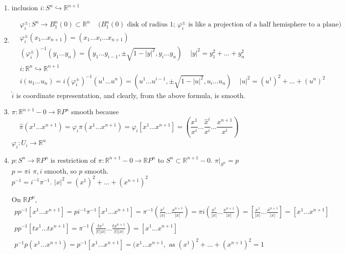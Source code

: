 \documentclass[11pt]{amsart}
\theoremstyle{definition}
\begin{document}
\begin{enumerate}
\item[(a)] inclusion $i: S^n \hookrightarrow \mathbb{R}^{n+1}$
\item[(b)]
\[
\begin{aligned}
  & \varphi_i^{\pm}:S^n \to B_1^n(0) \subset \mathbb{R}^n \quad \, \text{($B_1^n(0)$ disk of radius 1; $\varphi_i^{\pm} $ is like a projection of a half hemisphere to a plane)} \\
  & \varphi_i^{\pm}(x_1 \dots x_{n+1}) = (x_1 \dots \widehat{x}_i \dots x_{n+1} ) \\
  & (\varphi_i^{\pm})^{-1}(y_1 \dots y_n) = (y_1 \dots y_{i-1}, \pm \sqrt{ 1 - |y|^2 } , y_i \dots y_n ) \quad \, |y|^2 = y_1^2 + \dots + y_n^2
\end{aligned}
\]
\[
\begin{aligned}
  & \widehat{i} : \mathbb{R}^n \hookrightarrow \mathbb{R}^{n+1} \\
  & \widehat{i}(u_1 \dots u_n) = i (\varphi_i^{\pm})^{-1}(u^1 \dots u^n) = (u^1 \dots u^{i-1}, \pm \sqrt{ 1 - |u|^2 } , u_i \dots u_n )  \quad \, |u|^2 =  (u^1)^2  + \dots + (u^n)^2
\end{aligned}
\]
$\widehat{i}$ is coordinate representation, and clearly, from the above formula, is smooth.
\item[(c)] $\pi : \mathbb{R}^{n+1} - 0 \to \mathbb{R}P^n$ smooth because
\[
\widehat{\pi}(x^1 \dots x^{n+1})  = \varphi_i \pi(x^1 \dots x^{n+1}) = \varphi_i[x^1 \dots x^{n+1}] = \left( \frac{x^1 }{ x^i } \dots \frac{ \widehat{x}^i}{ x^i } \dots \frac{x^{n+1}}{ x^i } \right)
\]
$\varphi_i : U_i \to \mathbb{R}^n$
\item[(d)] $p : S^n \to \mathbb{R}P^n$ is restriction of $\pi: \mathbb{R}^{n+1} - 0 \to \mathbb{R}P^n$ to $S^n \subset \mathbb{R}^{n+1} -0$.  $\left. \pi \right|_{S^n} = p$ \\
$p = \pi i$ $\pi,i$ smooth, so $p$ smooth.  \\
$p^{-1} = i^{-1} \pi^{-1}$.  $|x|^2 = (x^1)^2 + \dots + (x^{n+1})^2$

On $\mathbb{R}P^n$,
\[
\begin{gathered}
  pp^{-1}[x^1 \dots x^{n+1} ] = p i^{-1} \pi^{-1}[x^1 \dots x^{n+1} ] = \pi^{-1}\left( \frac{x^1}{ |x| } \dots \frac{x^{n+1}}{ |x| } \right) = \pi i\left( \frac{x^1}{|x|} \dots \frac{x^{n+1}}{ |x|} \right) = \left[ \frac{x^1}{ |x|} \dots \frac{x^{n+1}}{ |x|} \right] = [x^1 \dots x^{n+1} ] \\
  pp^{-1}[tx^1 \dots tx^{n+1} ] = \pi^{-1}\left( \frac{tx^1}{ |t||x|} \dots \frac{t x^{n+1}}{ |t||x| } \right) = [x^1 \dots x^{n+1} ] \\
   p^{-1}p(x^1 \dots x^{n+1} ) = p^{-1}[x^1 \dots x^{n+1}] = (x^1 \dots x^{n+1}, \text{ as } (x^1)^2 + \dots + (x^{n+1})^2 = 1
\end{gathered}
\]


\end{enumerate}
\end{document}
